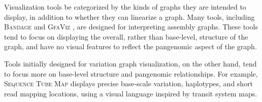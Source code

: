 Visualization tools be categorized by the kinds of graphs they are intended to display, in addition to whether they can linearize a graph.
Many tools, including \textsc{Bandage} \citep{Wick_2015} and \textsc{GfaViz} \cite{Gonnella_2018}, are designed for interpreting assembly graphs. 
These tools tend to focus on displaying the overall, rather than base-level, structure of the graph, and have no visual features to reflect the pangenomic aspect of the graph.

Tools initially designed for variation graph visualization, on the other hand, tend to focus more on base-level structure and pangenomic relationships.
For example, \textsc{Sequence Tube Map} \cite{Beyer_2019} displays precise base-scale variation, haplotypes, and short read mapping locations, using a visual language inspired by transit system maps.



